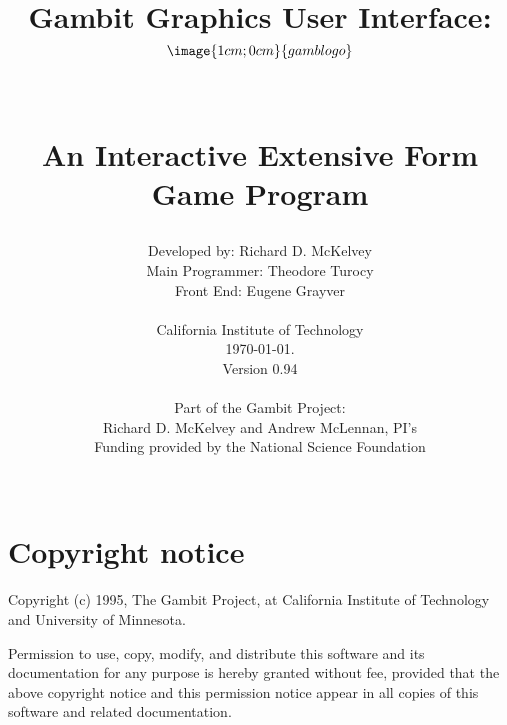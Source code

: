 %
%
%
%

\parskip=10pt%
\parindent=0pt%
\itemsep{0pt}
\title{Gambit Graphics User Interface:\\
$$\image{1cm;0cm}{gamblogo}$$\\
\centerline{An Interactive Extensive Form Game Program}}
\author{Developed by: Richard D. McKelvey\\
Main Programmer: Theodore Turocy\\
Front End: Eugene Grayver\\
 \\
California Institute of Technology\\ \today.\\
Version 0.94\\
 \\
Part of the Gambit Project:\\
Richard D. McKelvey and Andrew McLennan, PI's\\
Funding provided by the National Science Foundation\\
 \\}

\makeindex%
%
\maketitle%


\tableofcontents%

\chapter*{Copyright notice}%

Copyright (c) 1995, The Gambit Project, at California Institute of
Technology and University of Minnesota.  

Permission to use, copy, modify, and distribute this software and its
documentation for any purpose is hereby granted without fee, provided that the
above copyright notice and this permission notice appear in
all copies of this software and related documentation.

